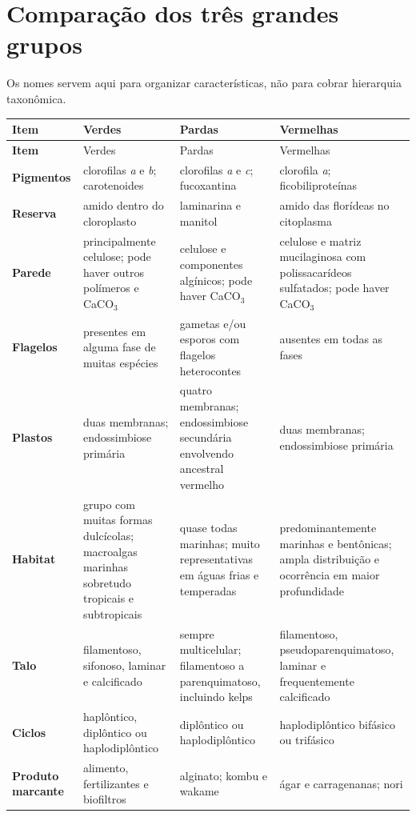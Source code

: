 \documentclass[12pt,a4paper]{article}
\begin{document}
\section{Comparação dos três grandes grupos}
Os nomes servem aqui para organizar características, não para cobrar hierarquia
taxonômica.

\begin{longtable}{>{\bfseries}p{}p{}p{}p{}}
\toprule
Item & Verdes & Pardas & Vermelhas\\
\midrule
\endfirsthead
\toprule
Item & Verdes & Pardas & Vermelhas\\
\midrule
\endhead
Pigmentos & clorofilas \textit{a} e \textit{b}; carotenoides & clorofilas
\textit{a} e \textit{c}; fucoxantina & clorofila \textit{a};
ficobiliproteínas\\
Reserva & amido dentro do cloroplasto & laminarina e manitol & amido das
florídeas no citoplasma\\
Parede & principalmente celulose; pode haver outros polímeros e CaCO$_3$ &
celulose e componentes algínicos; pode haver CaCO$_3$ & celulose e matriz
mucilaginosa com polissacarídeos sulfatados; pode haver CaCO$_3$\\
Flagelos & presentes em alguma fase de muitas espécies & gametas e/ou esporos
com flagelos heterocontes & ausentes em todas as fases\\
Plastos & duas membranas; endossimbiose primária & quatro membranas;
endossimbiose secundária envolvendo ancestral vermelho & duas membranas;
endossimbiose primária\\
Habitat & grupo com muitas formas dulcícolas; macroalgas marinhas sobretudo
tropicais e subtropicais & quase todas marinhas; muito representativas em águas
frias e temperadas & predominantemente marinhas e bentônicas; ampla distribuição
e ocorrência em maior profundidade\\
Talo & filamentoso, sifonoso, laminar e calcificado & sempre multicelular;
filamentoso a parenquimatoso, incluindo kelps & filamentoso,
pseudoparenquimatoso, laminar e frequentemente calcificado\\
Ciclos & haplôntico, diplôntico ou haplodiplôntico & diplôntico ou
haplodiplôntico & haplodiplôntico bifásico ou trifásico\\
Produto marcante & alimento, fertilizantes e biofiltros & alginato; kombu e
wakame & ágar e carragenanas; nori\\
\bottomrule
\end{longtable}
\end{document}
